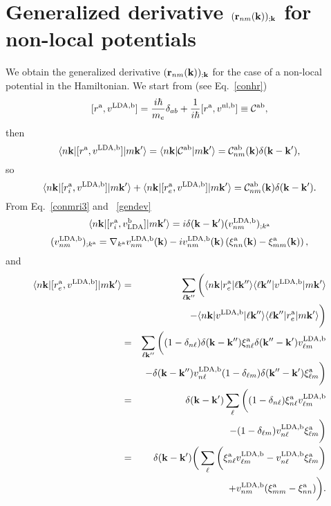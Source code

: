 \section{Generalized derivative $(\mathbf{r}_{nm}(\mathbf{k}))_{;\mathbf{k}}$ for
  non-local potentials}\label{gder}

We obtain the generalized derivative $(\mathbf{r}_{nm}(\mathbf{k}))_{;\mathbf{k}}$ for
the case of a non-local potential in the Hamiltonian.
We start from (see Eq.~\eqref{conhr})
\begin{equation}\label{na_hrdab}
[r^{\mathrm{a}},v^{\mathrm{LDA},\mathrm{b}}]= 
\frac{i\hbar}{m_e}\delta_{ab}+
\frac{1}{i\hbar}[r^{\mathrm{a}},v^{\mathrm{nl},\mathrm{b}}]
\equiv
{\mathbf{\cal C}}^{\mathrm{a}\mathrm{b}}
,
\end{equation} 
then
\begin{equation}\label{na_hrdab2}
\langle n\mathbf{k} |[r^{\mathrm{a}},v^{\mathrm{LDA},\mathrm{b}}]| m\mathbf{k}' \rangle
=
\langle n\mathbf{k} |{\mathbf{\cal C}}^{\mathrm{a}\mathrm{b}}| m\mathbf{k}' \rangle
=
{\mathbf{\cal C}}^{\mathrm{a}\mathrm{b}}_{nm}(\mathbf{k})\delta(\mathbf{k}-\mathbf{k}')
,
\end{equation}
so
\begin{equation}\label{na_hrdab3}
\langle n\mathbf{k} |[r^{\mathrm{a}}_i,v^{\mathrm{LDA},\mathrm{b}}]| m\mathbf{k}' \rangle
+
\langle n\mathbf{k} |[r^{\mathrm{a}}_e,v^{\mathrm{LDA},\mathrm{b}}]| m\mathbf{k}' \rangle
=
{\mathbf{\cal C}}^{\mathrm{a}\mathrm{b}}_{nm}(\mathbf{k})\delta(\mathbf{k}-\mathbf{k}')
.
\end{equation}
From Eq.~\eqref{conmri3} and ~\eqref{gendev}
\begin{equation}\label{na_rip}
\langle n\mathbf{k} |[r^{\mathrm{a}}_i,v_{\mathrm{LDA}}^{\mathrm{b}}]| m\mathbf{k}' \rangle
=i\delta(\mathbf{k}-\mathbf{k}')(v_{nm}^{\mathrm{LDA},\mathrm{b}})_{;k^{\mathrm{a}}}
\end{equation}
\begin{equation}\label{na_ripn}
(v^{\mathrm{LDA},\mathrm{b}}_{nm})_{;k^{\mathrm{a}}}=
\nabla_{k^{\mathrm{a}}}
v^{\mathrm{LDA},\mathrm{b}}_{n m}(\mathbf{k})
-
i
v^{\mathrm{LDA},\mathrm{b}}_{nm}(\mathbf{k})
\left(
\xi^{\mathrm{a}}_{nn}(\mathbf{k})
-
\xi^{\mathrm{a}}_{mm}(\mathbf{k})
\right)
,
\end{equation}
and
\begin{eqnarray}\label{na_rep}
\langle n\mathbf{k} |[r^{\mathrm{a}}_e,v^{\mathrm{LDA},\mathrm{b}}]| m\mathbf{k}' \rangle&=&
\sum_{\ell\mathbf{k}''}
\bigg(
\langle n\mathbf{k} |r^{\mathrm{a}}_e| \ell\mathbf{k}'' \rangle\langle \ell\mathbf{k}'' |v^{\mathrm{LDA},\mathrm{b}}| m\mathbf{k}' \rangle
\nonumber \\
&&
-
\langle n\mathbf{k} |v^{\mathrm{LDA},\mathrm{b}}| \ell\mathbf{k}'' \rangle\langle \ell\mathbf{k}'' |r^{\mathrm{a}}_e| m\mathbf{k}' \rangle
\bigg)
\nonumber \\
&=&
\sum_{\ell\mathbf{k}''}
\bigg(
(1-\delta_{n\ell})\delta(\mathbf{k}-\mathbf{k}'')\xi^{\mathrm{a}}_{n\ell}
\delta(\mathbf{k}''-\mathbf{k}')v^{\mathrm{LDA},\mathrm{b}}_{\ell m}
\nonumber \\
&&-
\delta(\mathbf{k}-\mathbf{k}'')v^{\mathrm{LDA},\mathrm{b}}_{n\ell}
(1-\delta_{\ell m})\delta(\mathbf{k}''-\mathbf{k}')\xi^{\mathrm{a}}_{\ell m}
\bigg)
\nonumber \\
&=&
\delta(\mathbf{k}-\mathbf{k}')
\sum_{\ell}
\bigg(
(1-\delta_{n\ell})
\xi^{\mathrm{a}}_{n\ell}
v^{\mathrm{LDA},\mathrm{b}}_{\ell m}
\nonumber \\
&&-
(1-\delta_{\ell m})
v^{\mathrm{LDA},\mathrm{b}}_{n\ell}
\xi^{\mathrm{a}}_{\ell m}
\bigg)
\nonumber \\
&=&
\delta(\mathbf{k}-\mathbf{k}')
\bigg(
\sum_{\ell}
\bigg(
\xi^{\mathrm{a}}_{n\ell}
v^{\mathrm{LDA},\mathrm{b}}_{\ell m}
-
v^{\mathrm{LDA},\mathrm{b}}_{n\ell}
\xi^{\mathrm{a}}_{\ell m}
\bigg)
\nonumber \\
&&+
v^{\mathrm{LDA},\mathrm{b}}_{nm}(\xi^{\mathrm{a}}_{mm}
-
\xi^{\mathrm{a}}_{nn}
)
\bigg)
.
\end{eqnarray}
